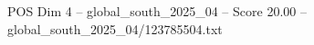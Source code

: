 \begin{textsample}{POS Dim 4 – global\_south\_2025\_04 – Score 20.00 – global\_south\_2025\_04/123785504.txt}
\end{textsample}
